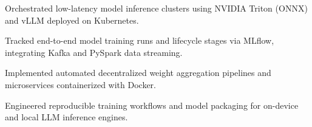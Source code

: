 \documentclass[../main.tex]{subfiles}
\begin{document}
\begin{tightemize}
\item Orchestrated low-latency model inference clusters using NVIDIA Triton (ONNX) and vLLM deployed on Kubernetes.
\item Tracked end-to-end model training runs and lifecycle stages via MLflow, integrating Kafka and PySpark data streaming.
\end{tightemize}
\sectionsep

\begin{tightemize}
\item Implemented automated decentralized weight aggregation pipelines and microservices containerized with Docker.
\item Engineered reproducible training workflows and model packaging for on-device and local LLM inference engines.
\end{tightemize}
\end{document}
